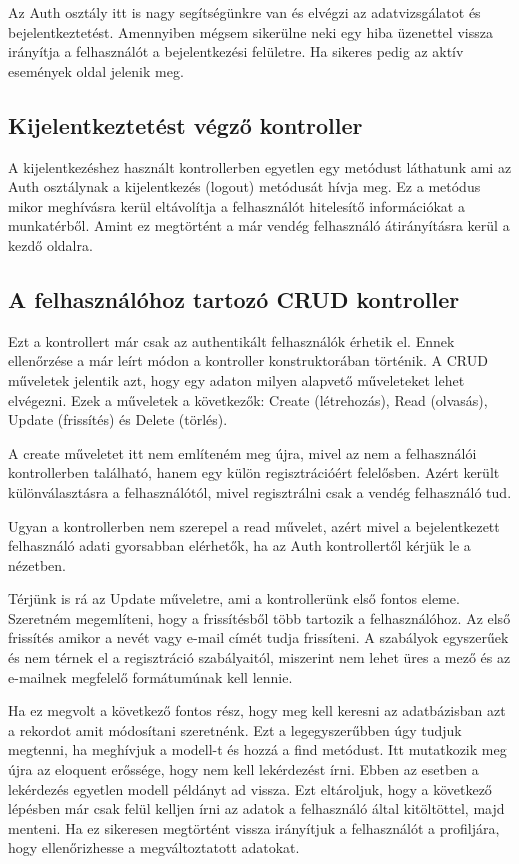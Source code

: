 \documentclass[
]{thesis-ekf}
\theoremstyle{definition}
\theoremstyle{remark}
\begin{document}
	Az Auth osztály itt is nagy segítségünkre van és elvégzi az adatvizsgálatot és bejelentkeztetést. Amennyiben mégsem sikerülne neki egy hiba üzenettel vissza irányítja a felhasználót a bejelentkezési felületre. Ha sikeres pedig az aktív események oldal jelenik meg.
	
	\subsection{Kijelentkeztetést végző kontroller} 
	A kijelentkezéshez használt kontrollerben egyetlen egy metódust láthatunk ami az Auth osztálynak a kijelentkezés (logout) metódusát hívja meg. Ez a metódus mikor meghívásra kerül eltávolítja a felhasználót hitelesítő információkat a munkatérből. Amint ez megtörtént a már vendég felhasználó átirányításra kerül a kezdő oldalra.
	
	\subsection{A felhasználóhoz tartozó CRUD kontroller}
	Ezt a kontrollert már csak az authentikált felhasználók érhetik el. Ennek ellenőrzése a már leírt módon a kontroller konstruktorában történik. A CRUD műveletek jelentik azt, hogy egy adaton milyen alapvető műveleteket lehet elvégezni. Ezek a műveletek a következők: Create (létrehozás), Read (olvasás), Update (frissítés) és Delete (törlés). 
	
	A create műveletet itt nem említeném meg újra, mivel az nem a felhasználói kontrollerben található, hanem egy külön regisztrációért felelősben. Azért került különválasztásra a felhasználótól, mivel regisztrálni csak a vendég felhasználó tud. 
	
	Ugyan a kontrollerben nem szerepel a read művelet, azért mivel a bejelentkezett felhasználó adati gyorsabban elérhetők, ha az Auth kontrollertől kérjük le a nézetben.
	
	Térjünk is rá az Update műveletre, ami a kontrollerünk első fontos eleme. Szeretném megemlíteni, hogy a frissítésből több tartozik a felhasználóhoz. Az első frissítés amikor a nevét vagy e-mail címét tudja frissíteni. A szabályok egyszerűek és nem térnek el a regisztráció szabályaitól, miszerint nem lehet üres a mező és az e-mailnek megfelelő formátumúnak kell lennie.
	
	Ha ez megvolt a következő fontos rész, hogy meg kell keresni az adatbázisban azt a rekordot amit módosítani szeretnénk. Ezt a legegyszerűbben úgy tudjuk megtenni, ha meghívjuk a modell-t és hozzá a find metódust. Itt mutatkozik meg újra az eloquent erőssége, hogy nem kell lekérdezést írni. Ebben az esetben a lekérdezés egyetlen modell példányt ad vissza. Ezt eltároljuk, hogy a következő lépésben már csak felül kelljen írni az adatok a felhasználó által kitöltöttel, majd menteni. Ha ez sikeresen megtörtént vissza irányítjuk a felhasználót a profiljára, hogy ellenőrizhesse a megváltoztatott adatokat. 
	
\end{document}
